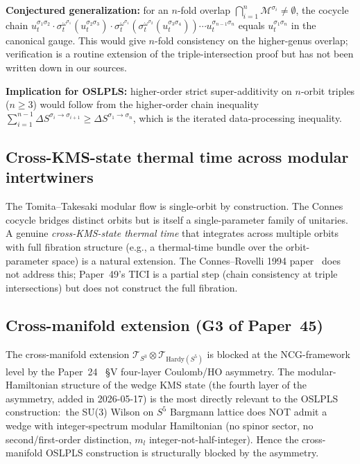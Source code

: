 \documentclass[11pt,a4paper]{article}
\theoremstyle{plain}
\theoremstyle{definition}
\newcommand{\sthree}{S^{3}}
\newcommand{\Tcal}{\mathcal{T}}
\newcommand{\Mcal}{\mathcal{M}}
\newcommand{\Morb}[1]{\Mcal^{\sigma_{#1}}}
\newcommand{\omegaOrb}[1]{\omega^{\sigma_{#1}}}
\newcommand{\cocyc}[2]{u_{t}^{\sigma_{#1}\sigma_{#2}}}
\newcommand{\DelS}[2]{\Delta S^{\sigma_{#1}\to\sigma_{#2}}}
\begin{document}
\textbf{Conjectured generalization:} for an $n$-fold overlap
$\bigcap_{i=1}^{n}\Morb{i}\ne\emptyset$, the cocycle chain
$\cocyc{1}{2}\cdot\sigma_{t}^{\omegaOrb{1}}(\cocyc{2}{3})\cdot
\sigma_{t}^{\omegaOrb{1}}(\sigma_{t}^{\omegaOrb{2}}(\cocyc{3}{4}))\cdots
\cocyc{n-1}{n}$ equals $\cocyc{1}{n}$ in the canonical gauge. This
would give $n$-fold consistency on the higher-genus overlap;
verification is a routine extension of the triple-intersection proof
but has not been written down in our sources.

\textbf{Implication for OSLPLS:} higher-order strict super-additivity
on $n$-orbit triples ($n\ge 3$) would follow from the higher-order
chain inequality $\sum_{i=1}^{n-1}\DelS{i}{i+1}\ge\DelS{1}{n}$, which
is the iterated data-processing inequality.

\subsection{Cross-KMS-state thermal time across modular intertwiners}
\label{sec:open_cross_kms_intertwiners}

The Tomita--Takesaki modular flow is single-orbit by construction.
The Connes cocycle bridges distinct orbits but is itself a
single-parameter family of unitaries. A genuine \emph{cross-KMS-state
thermal time} that integrates across multiple orbits with full
fibration structure (e.g., a thermal-time bundle over the orbit-
parameter space) is a natural extension. The Connes--Rovelli 1994
paper~\cite{connes_rovelli1994} does not address this; Paper~49's
TICI is a partial step (chain consistency at triple intersections)
but does not construct the full fibration.

\subsection{Cross-manifold extension (G3 of Paper~45)}
\label{sec:open_g3}

The cross-manifold extension $\Tcal_{\sthree}\otimes\Tcal_{\mathrm{Hardy}(S^{5})}$
is blocked at the NCG-framework level by the Paper~24
\cite{paper24}~\S V four-layer Coulomb/HO asymmetry. The
modular-Hamiltonian structure of the wedge KMS state (the fourth
layer of the asymmetry, added in 2026-05-17) is the most directly
relevant to the OSLPLS construction:\ the SU(3) Wilson on $S^{5}$
Bargmann lattice does NOT admit a wedge with integer-spectrum modular
Hamiltonian (no spinor sector, no second/first-order distinction,
$m_{l}$ integer-not-half-integer). Hence the cross-manifold OSLPLS
construction is structurally blocked by the asymmetry.
\end{document}
